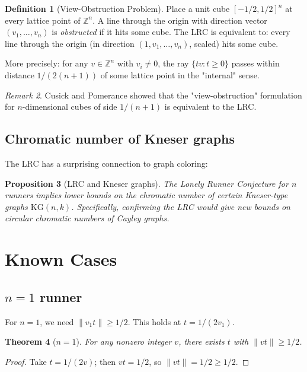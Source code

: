 \documentclass[12pt,a4paper]{amsart}
\newtheorem{theorem}{Theorem}[section]
\newtheorem{proposition}[theorem]{Proposition}
\theoremstyle{definition}
\newtheorem{definition}[theorem]{Definition}
\theoremstyle{remark}
\newtheorem{remark}[theorem]{Remark}
\newcommand{\Z}{\mathbb{Z}}
\begin{document}
\begin{definition}[View-Obstruction Problem]
Place a unit cube $[-1/2, 1/2]^n$ at every lattice point of $\Z^n$.
A line through the origin with direction vector $(v_1, \ldots, v_n)$ is
\emph{obstructed} if it hits some cube. The LRC is equivalent to: every line
through the origin (in direction $(1, v_1, \ldots, v_n)$, scaled) hits some cube.

More precisely: for any $v \in \Z^n$ with $v_i \neq 0$, the ray $\{tv : t \geq 0\}$
passes within distance $1/(2(n+1))$ of some lattice point in the "internal" sense.
\end{definition}

\begin{remark}
Cusick and Pomerance \cite{CusickPomerance1984} showed that the "view-obstruction"
formulation for $n$-dimensional cubes of side $1/(n+1)$ is equivalent to the LRC.
\end{remark}

\subsection{Chromatic number of Kneser graphs}

The LRC has a surprising connection to graph coloring:

\begin{proposition}[LRC and Kneser graphs]\label{prop:kneser}
The Lonely Runner Conjecture for $n$ runners implies lower bounds on the
chromatic number of certain Kneser-type graphs $\mathrm{KG}(n, k)$.
Specifically, confirming the LRC would give new bounds on circular chromatic
numbers of Cayley graphs.
\end{proposition}

\section{Known Cases}\label{sec:known}

\subsection{$n = 1$ runner}

For $n = 1$, we need $\|v_1 t\| \geq 1/2$. This holds at $t = 1/(2v_1)$.

\begin{theorem}[$n = 1$]\label{thm:n1}
For any nonzero integer $v$, there exists $t$ with $\|vt\| \geq 1/2$.
\end{theorem}
\begin{proof}
Take $t = 1/(2v)$; then $vt = 1/2$, so $\|vt\| = 1/2 \geq 1/2$. \end{proof}
\end{document}
